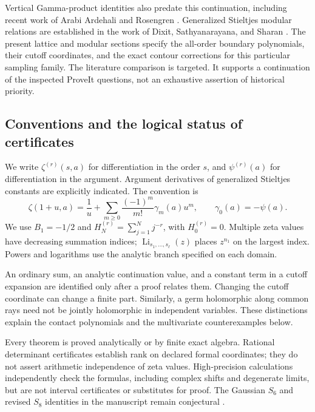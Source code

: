 \documentclass[11pt,letterpaper]{article}
\numberwithin{equation}{section}
\theoremstyle{definition}
\theoremstyle{remark}
\DeclareMathOperator{\Li}{Li}
\begin{document}
Vertical Gamma-product identities also predate this continuation,
including recent work of Arabi Ardehali and Rosengren
\cite{ArdehaliRosengren}. Generalized Stieltjes modular relations
are established in the work of Dixit, Sathyanarayana, and Sharan
\cite{DixitStieltjes}. The present lattice and modular sections
specify the all-order boundary polynomials, their cutoff
coordinates, and the exact contour corrections for this particular
sampling family. The literature comparison is targeted. It
supports a continuation of the inspected ProveIt questions, not
an exhaustive assertion of historical priority.

\subsection{Conventions and the logical status of certificates}

We write \(\zeta^{(r)}(s,a)\) for differentiation in the order
\(s\), and \(\psi^{(r)}(a)\) for differentiation in the argument.
Argument derivatives of generalized Stieltjes constants are
explicitly indicated. The convention is
\[
 \zeta(1+u,a)=\frac1u+
       \sum_{m\ge0}\frac{(-1)^m}{m!}\gamma_m(a)u^m,
 \qquad \gamma_0(a)=-\psi(a).
\]
We use \(B_1=-1/2\) and
\(H_N^{(r)}=\sum_{j=1}^N j^{-r}\), with \(H_0^{(r)}=0\).
Multiple zeta values have decreasing summation indices;
\(\Li_{s_1,\ldots,s_\ell}(z)\) places \(z^{n_1}\) on the
largest index. Powers and logarithms use the analytic branch
specified on each domain.

An ordinary sum, an analytic continuation value, and a constant
term in a cutoff expansion are identified only after a proof
relates them. Changing the cutoff coordinate can change a
finite part. Similarly, a germ holomorphic along common rays
need not be jointly holomorphic in independent variables.
These distinctions explain the contact polynomials and the
multivariate counterexamples below.

Every theorem is proved analytically or by finite exact algebra.
Rational determinant certificates establish rank on declared
formal coordinates; they do not assert arithmetic independence
of zeta values. High-precision calculations independently check
the formulas, including complex shifts and degenerate limits,
but are not interval certificates or substitutes for proof.
The Gaussian \(S_6\) and revised \(S_8\) identities in the
manuscript remain conjectural \cite{RepoManuscript}.




\end{document}
